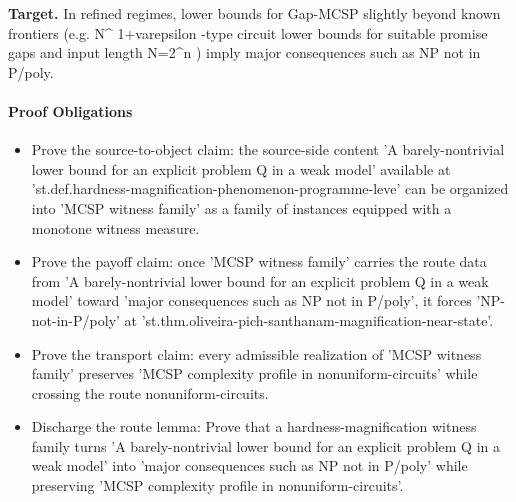 \documentclass[11pt]{article}
\begin{document}
\textbf{Target.} In refined regimes, lower bounds for Gap-MCSP slightly beyond known frontiers (e.g. N\textasciicircum{} 1+varepsilon -type circuit lower bounds for suitable promise gaps and input length N=2\textasciicircum{}n ) imply major consequences such as NP not in P/poly.

\paragraph{Proof Obligations}
\begin{itemize}[leftmargin=*,itemsep=0.2em]
\item Prove the source-to-object claim: the source-side content 'A barely-nontrivial lower bound for an explicit problem Q in a weak model' available at 'st.def.hardness-magnification-phenomenon-programme-leve' can be organized into 'MCSP witness family' as a family of instances equipped with a monotone witness measure.
\item Prove the payoff claim: once 'MCSP witness family' carries the route data from 'A barely-nontrivial lower bound for an explicit problem Q in a weak model' toward 'major consequences such as NP not in P/poly', it forces 'NP-not-in-P/poly' at 'st.thm.oliveira-pich-santhanam-magnification-near-state'.
\item Prove the transport claim: every admissible realization of 'MCSP witness family' preserves 'MCSP complexity profile in nonuniform-circuits' while crossing the route nonuniform-circuits.
\item Discharge the route lemma: Prove that a hardness-magnification witness family turns 'A barely-nontrivial lower bound for an explicit problem Q in a weak model' into 'major consequences such as NP not in P/poly' while preserving 'MCSP complexity profile in nonuniform-circuits'.
\end{itemize}
\end{document}
